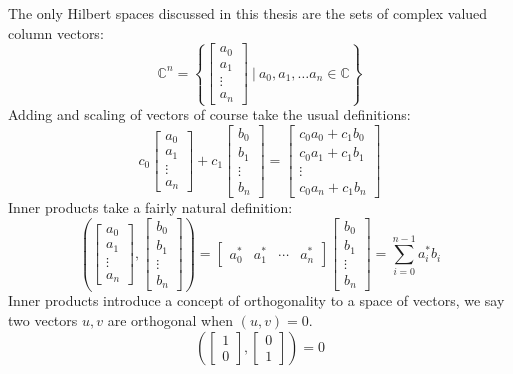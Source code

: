 The only Hilbert spaces discussed in this thesis are the sets of complex valued column vectors:
\[\mathbb{C}^n = \left\{\left[\begin{matrix} a_0\\a_1\\\vdots\\a_n\end{matrix}\right]\ |\ a_0, a_1, \dots a_n \in \mathbb{C}\right\}\]
Adding and scaling of vectors of course take the usual definitions:
\[
c_0\left[\begin{matrix} a_0\\a_1\\\vdots\\a_n\end{matrix}\right]
+
c_1\left[\begin{matrix} b_0\\b_1\\\vdots\\b_n\end{matrix}\right]
=
\left[\begin{matrix} c_0a_0+c_1b_0\\c_0a_1+c_1b_1\\\vdots\\c_0a_n+c_1b_n\end{matrix}\right]
\]
Inner products take a fairly natural definition:
\[
\left(
\left[\begin{matrix} a_0\\a_1\\\vdots\\a_n\end{matrix}\right]
,
\left[\begin{matrix} b_0\\b_1\\\vdots\\b_n\end{matrix}\right]
\right)
=
\left[\begin{matrix} a_0^*&a_1^*&\cdots&a_n^*\end{matrix}\right]
\left[\begin{matrix} b_0\\b_1\\\vdots\\b_n\end{matrix}\right]
= \sum_{i=0}^{n-1} a_i^*b_i
\]
Inner products introduce a concept of orthogonality to a space of vectors, we say two vectors $u, v$ are orthogonal when $(u, v) = 0$.
\[
\left(\left[\begin{matrix}1\\0\end{matrix}\right],\left[\begin{matrix}0\\1\end{matrix}\right]\right) = 0
\]
